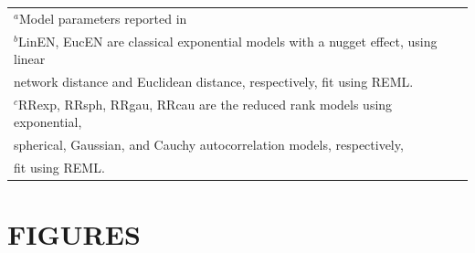 \documentclass[11pt, titlepage]{article}\usepackage[]{graphicx}\usepackage[]{color}
\begin{document}
\begin{spacing}{1.9}
\begin{flushleft}
\begin{table}[ht]
\begin{center}
\begin{tabular}{c|rrrr|rrrr}
\multicolumn{9}{l}{\footnotesize$^a$Model parameters reported in \citet{Ladl:Avga:Whea:Boyc:pred:2016}} \\
\multicolumn{9}{l}{\footnotesize$^b$LinEN, EucEN are classical exponential models with a nugget effect, using linear} \\
\multicolumn{9}{l}{\footnotesize \hspace{.5cm}  network distance and Euclidean distance, respectively, fit using REML.} \\
\multicolumn{9}{l}{\footnotesize$^c$RRexp, RRsph, RRgau, RRcau are the reduced rank models using exponential, } \\
\multicolumn{9}{l}{\footnotesize \hspace{.5cm} spherical, Gaussian, and Cauchy autocorrelation models, respectively,} \\
\multicolumn{9}{l}{\footnotesize \hspace{.5cm} fit using REML.}
\end{tabular}
\end{center}
\end{table}



\clearpage


\section*{FIGURES}


\begin{singlespace}


\end{singlespace}
\end{flushleft}
\end{spacing}
\end{document}
